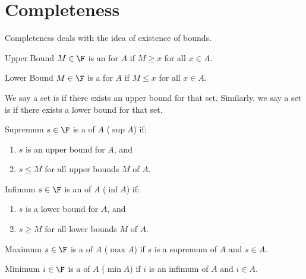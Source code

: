 \documentclass[letterpaper,12pt]{report}
\begin{document}
\section{Completeness}
Completeness deals with the idea of existence of bounds.

\begin{dfnbox}{Upper Bound}{}
	$M \in \F$ is an  for $A$ if $M \geq x$ for all $x \in A$.
\end{dfnbox}

\begin{dfnbox}{Lower Bound}{}
	$M \in \F$ is a  for $A$ if $M \leq x$ for all $x \in A$.
\end{dfnbox}

We say a set is  if there exists an upper bound for that set. Similarly, we say a set is  if there exists a lower bound for that set.

\begin{dfnbox}{Supremum}{}
	$s \in \F$ is a  of $A$ ($\sup A$) if:
	\begin{enumerate}
		\item $s$ is an upper bound for $A$, and
		\item $s \leq M$ for all upper bounds $M$ of $A$.
	\end{enumerate}
\end{dfnbox}

\begin{dfnbox}{Infimum}{}
	$s \in \F$ is an  of $A$ ($\inf A$) if:
	\begin{enumerate}
		\item $s$ is a lower bound for $A$, and
		\item $s \geq M$ for all lower bounds $M$ of $A$.
	\end{enumerate}
\end{dfnbox}

\begin{dfnbox}{Maximum}{}
	$s \in \F$ is a  of $A$ ($\max A$) if $s$ is a supremum of $A$ and $s \in A$.
\end{dfnbox}

\begin{dfnbox}{Minimum}{}
	$i \in \F$ is a  of $A$ ($\min A$) if $i$ is an infimum of $A$ and $i \in A$.
\end{dfnbox}

\end{document}

